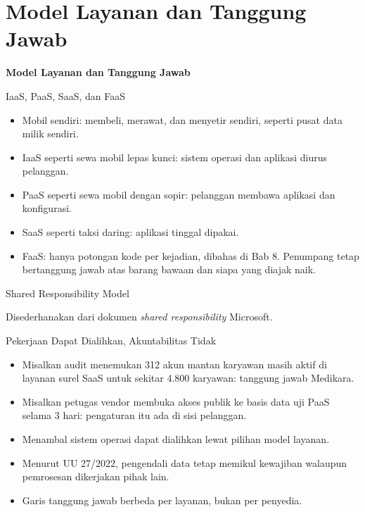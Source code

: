 \documentclass[aspectratio=169, table, 12pt]{beamer}
\begin{document}
\section{Model Layanan dan Tanggung Jawab}

\begin{frame}{\hfill}
  \centering
  \Huge{\textbf{Model Layanan dan Tanggung Jawab}}
\end{frame}

\begin{frame}{IaaS, PaaS, SaaS, dan FaaS}
  \small
  \begin{itemize}
    \item Mobil sendiri: membeli, merawat, dan menyetir sendiri, seperti pusat data milik
          sendiri.
    \item IaaS seperti sewa mobil lepas kunci: sistem operasi dan aplikasi diurus pelanggan.
    \item PaaS seperti sewa mobil dengan sopir: pelanggan membawa aplikasi dan konfigurasi.
    \item SaaS seperti taksi daring: aplikasi tinggal dipakai.
    \item FaaS: hanya potongan kode per kejadian, dibahas di Bab 8. Penumpang tetap
          bertanggung jawab atas barang bawaan dan siapa yang diajak naik.
  \end{itemize}
\end{frame}

\begin{frame}{Shared Responsibility Model}
  \begin{center}
  \end{center}
  {\footnotesize Disederhanakan dari dokumen \textit{shared responsibility} Microsoft.}
\end{frame}

\begin{frame}{Pekerjaan Dapat Dialihkan, Akuntabilitas Tidak}
  \small
  \begin{itemize}
    \item Misalkan audit menemukan 312 akun mantan karyawan masih aktif di layanan surel SaaS
          untuk sekitar 4.800 karyawan: tanggung jawab Medikara.
    \item Misalkan petugas vendor membuka akses publik ke basis data uji PaaS selama 3 hari:
          pengaturan itu ada di sisi pelanggan.
    \item Menambal sistem operasi dapat dialihkan lewat pilihan model layanan.
    \item Menurut UU 27/2022, pengendali data tetap memikul kewajiban walaupun pemrosesan
          dikerjakan pihak lain.
    \item Garis tanggung jawab berbeda per layanan, bukan per penyedia.
  \end{itemize}
\end{frame}
\end{document}
